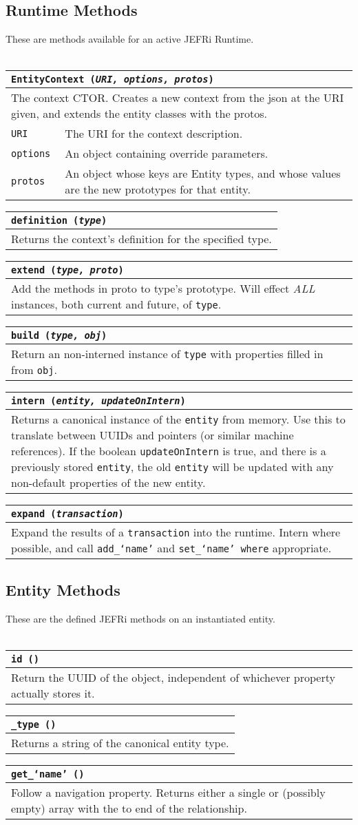 \documentclass{article}
\newcommand{\ilcode}{\tt}
\newcommand{\method}[4]{
	\noindent
	\begin{tabular}{ | l | p{5in} | }
	\hline
	\multicolumn{2}{|l|}{\large \ilcode #1 ({\it #2})} \\
	\hline
	\multicolumn{2}{|p{6in}|}{#3} \\
	\hline
	#4
	\end{tabular}
}
\newcommand{\param}[2]{
	{\ilcode #1} & #2 \\
	\hline
}
\begin{document}
\subsection{Runtime Methods}
These are methods available for an active JEFRi Runtime.
\\
\\
\method{EntityContext}{URI, options, protos}
{The context CTOR. Creates a new context from the json at the URI given,
	and extends the entity classes with the protos.}
	{
		\param{URI}{The URI for the context description.}
		\param{options}{An object containing override parameters.}
		\param{protos}{An object whose keys are Entity types, and whose values
			are the new prototypes for that entity.}
	}

\method{definition}{type}
	{Returns the context's definition for the specified type.}
	{}

\method{extend}{type, proto}
	{Add the methods in proto to type's prototype. Will effect {\it ALL}
	instances, both current and future, of {\ilcode type}.}{}

\method{build}{type, obj}
	{Return an non-interned instance of {\ilcode type} with properties
	filled in from {\ilcode obj}.}{}

\method{intern}{entity, updateOnIntern}
	{Returns a canonical instance of the {\ilcode entity} from memory. Use this to
	translate between UUIDs and pointers (or similar machine references). If
	the boolean {\ilcode updateOnIntern} is true, and there is a previously
	stored {\ilcode entity}, the old {\ilcode entity} will be updated with any non-default
	properties of the new entity.}{}

\method{expand}{transaction}
	{Expand the results of a {\ilcode transaction} into the runtime. Intern where
	possible, and call {\ilcode add\_`name'} and {\ilcode set\_`name' where}
	appropriate.}{}

\subsection{Entity Methods}
These are the defined JEFRi methods on an instantiated entity.
\\
\\
\method{id}{}
	{Return the UUID of the object, independent of whichever property
			actually stores it.}{}

\method{\_type}{}
	{Returns a string of the canonical entity type.}{}

\method{get\_`name'}{}
	{Follow a navigation property. Returns either a single or (possibly
			empty) array with the to end of the relationship.}{}
\end{document}
